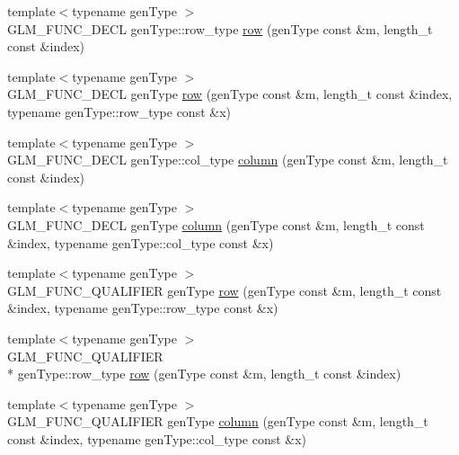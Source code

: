 \begin{DoxyCompactItemize}
\item 
{\footnotesize template$<$typename gen\-Type $>$ }\\G\-L\-M\-\_\-\-F\-U\-N\-C\-\_\-\-D\-E\-C\-L gen\-Type\-::row\-\_\-type \hyperlink{group__gtc__matrix__access_ga5b874831eef18913dbe30153e52a2476}{row} (gen\-Type const \&m, length\-\_\-t const \&index)
\item 
{\footnotesize template$<$typename gen\-Type $>$ }\\G\-L\-M\-\_\-\-F\-U\-N\-C\-\_\-\-D\-E\-C\-L gen\-Type \hyperlink{group__gtc__matrix__access_gacb34e8dca9cd0efdd247a65e36ed0a86}{row} (gen\-Type const \&m, length\-\_\-t const \&index, typename gen\-Type\-::row\-\_\-type const \&x)
\item 
{\footnotesize template$<$typename gen\-Type $>$ }\\G\-L\-M\-\_\-\-F\-U\-N\-C\-\_\-\-D\-E\-C\-L gen\-Type\-::col\-\_\-type \hyperlink{group__gtc__matrix__access_ga5c37fbeb062151f930e8a231c37e6b81}{column} (gen\-Type const \&m, length\-\_\-t const \&index)
\item 
{\footnotesize template$<$typename gen\-Type $>$ }\\G\-L\-M\-\_\-\-F\-U\-N\-C\-\_\-\-D\-E\-C\-L gen\-Type \hyperlink{group__gtc__matrix__access_gaff0c6f887deb04ce0519084d32aadb85}{column} (gen\-Type const \&m, length\-\_\-t const \&index, typename gen\-Type\-::col\-\_\-type const \&x)
\item 
{\footnotesize template$<$typename gen\-Type $>$ }\\G\-L\-M\-\_\-\-F\-U\-N\-C\-\_\-\-Q\-U\-A\-L\-I\-F\-I\-E\-R gen\-Type \hyperlink{group__gtc__matrix__access_gacb34e8dca9cd0efdd247a65e36ed0a86}{row} (gen\-Type const \&m, length\-\_\-t const \&index, typename gen\-Type\-::row\-\_\-type const \&x)
\item 
{\footnotesize template$<$typename gen\-Type $>$ }\\G\-L\-M\-\_\-\-F\-U\-N\-C\-\_\-\-Q\-U\-A\-L\-I\-F\-I\-E\-R \\*
gen\-Type\-::row\-\_\-type \hyperlink{group__gtc__matrix__access_ga5b874831eef18913dbe30153e52a2476}{row} (gen\-Type const \&m, length\-\_\-t const \&index)
\item 
{\footnotesize template$<$typename gen\-Type $>$ }\\G\-L\-M\-\_\-\-F\-U\-N\-C\-\_\-\-Q\-U\-A\-L\-I\-F\-I\-E\-R gen\-Type \hyperlink{group__gtc__matrix__access_gaff0c6f887deb04ce0519084d32aadb85}{column} (gen\-Type const \&m, length\-\_\-t const \&index, typename gen\-Type\-::col\-\_\-type const \&x)
\item 

\end{DoxyCompactItemize}
